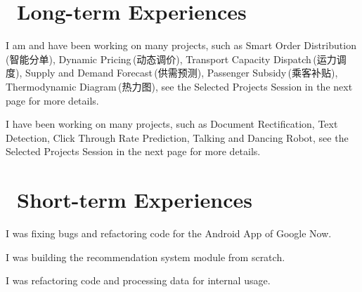 \documentclass{resume}
\begin{document}



\section{\faUsers\ Long-term Experiences}
I am and have been working on many projects, such as
Smart Order Distribution\,(智能分单),
Dynamic Pricing\,(动态调价),
Transport Capacity Dispatch\,(运力调度),
Supply and Demand Forecast\,(供需预测),
Passenger Subsidy\,(乘客补贴),
Thermodynamic Diagram\,(热力图), 
see the Selected Projects Session in the next page for more details.


I have been working on many projects, 
such as Document Rectification, Text Detection, Click Through Rate Prediction, Talking and Dancing Robot,
see the Selected Projects Session in the next page for more details.

\section{\faUser\ Short-term Experiences}

I was fixing bugs and refactoring code for the Android App of Google Now.

I was building the recommendation system module from scratch. 

I was refactoring code and processing data for internal usage.
\end{document}
